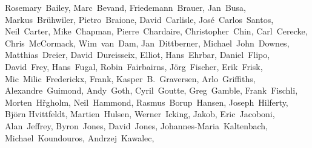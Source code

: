 { \flushleft\small
Rosemary~Bailey,        %
Marc~Bevand,            %
Friedemann~Brauer,      %
Jan~Busa,               %
Markus~Br\"uhwiler,     %
Pietro~Braione,         %
David~Carlisle,         %
Jos\'e~Carlos~Santos,   %
Neil~Carter,            %
Mike~Chapman,           %
Pierre~Chardaire,       %
Christopher~Chin,       %
Carl~Cerecke,           %
Chris~McCormack,        %
Wim~van~Dam,            %
Jan~Dittberner,         %
Michael~John~Downes,    %
Matthias~Dreier,        %
David~Dureisseix,       %
Elliot,                 %
Hans~Ehrbar,            %
Daniel~Flipo,           %
David~Frey,             %
Hans~Fugal,             %
Robin~Fairbairns,       %
J\"org~Fischer,         %
Erik~Frisk,             %
Mic~Milic~Frederickx,   %
Frank,                  %
Kasper~B.~Graversen,    %
Arlo~Griffiths,         %
Alexandre~Guimond,      %
Andy~Goth,              %
Cyril~Goutte,           %
Greg~Gamble,            %
Frank~Fischli,          %
Morten~Hřgholm,         %
Neil~Hammond,           %
Rasmus~Borup~Hansen,    %
Joseph~Hilferty,        %
Bj\"orn Hvittfeldt,     %
Martien~Hulsen,         %
Werner~Icking,          %
Jakob,                  %
Eric~Jacoboni,          %
Alan~Jeffrey,           %
Byron~Jones,            %
David~Jones,            %
Johannes-Maria~Kaltenbach, %
Michael~Koundouros,     %
Andrzej~Kawalec,        %
}
